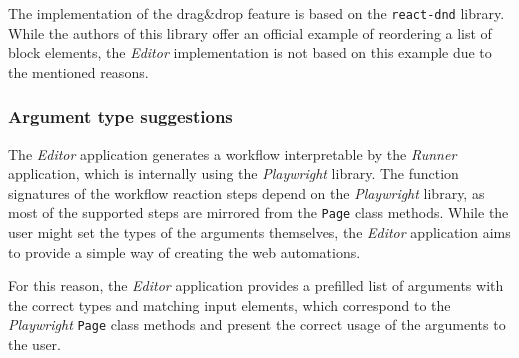 The implementation of the drag\&drop feature is based on the \texttt{react-dnd} library.
While the authors of this library offer an official example of reordering a list of block elements, the \textit{Editor} implementation is not based on this example due to the mentioned reasons.

\subsubsection{Argument type suggestions}
The \textit{Editor} application generates a workflow interpretable by the \textit{Runner} application, which is internally using the \textit{Playwright} library.
The function signatures of the workflow reaction steps depend on the \textit{Playwright} library, as most of the supported steps are mirrored from the \texttt{Page} class methods.
While the user might set the types of the arguments themselves, the \textit{Editor} application aims to provide a simple way of creating the web automations.

For this reason, the \textit{Editor} application provides a prefilled list of arguments with the correct types and matching input elements,
which correspond to the \textit{Playwright} \texttt{Page} class methods and present the correct usage of the arguments to the user.

\subsubsection{}
